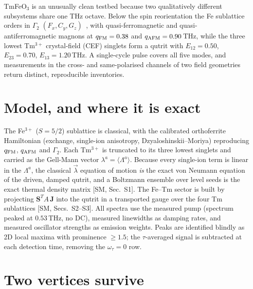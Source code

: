 \documentclass[aps,prb,twocolumn,superscriptaddress,longbibliography]{revtex4-2}
\newcommand{\ve}[1]{\boldsymbol{#1}}
\newcommand{\qafm}{q_{\rm AFM}}
\newcommand{\qfm}{q_{\rm FM}}
\begin{document}
TmFeO$_3$ is an unusually clean testbed because two qualitatively
different subsystems share one THz octave.  Below the spin reorientation
the Fe sublattice orders in $\Gamma_2$
$(F_x,C_y,G_z)$~\cite{Yamaguchi,Kimel2004,Zhang2016}, with
quasi-ferromagnetic and quasi-antiferromagnetic magnons at $\qfm=0.38$
and $\qafm=0.90$\,THz, while the three lowest Tm$^{3+}$ crystal-field
(CEF) singlets form a qutrit with $E_{12}=0.50$, $E_{23}=0.70$,
$E_{13}=1.20$\,THz.  A single-cycle pulse covers all five modes, and
measurements in the cross- and same-polarised channels of two field
geometries return distinct, reproducible inventories.

\section{Model, and where it is exact}

The Fe$^{3+}$ ($S=5/2$) sublattice is classical, with the calibrated
orthoferrite Hamiltonian (exchange, single-ion anisotropy,
Dzyaloshinskii--Moriya) reproducing $\qfm$, $\qafm$ and $\Gamma_2$.  Each
Tm$^{3+}$ is truncated to its three lowest singlets and carried as the
Gell-Mann vector $\lambda^a=\langle\Lambda^a\rangle$.  Because every
single-ion term is linear in the $\Lambda^a$, the classical
$\vec\lambda$ equation of motion \emph{is} the exact von Neumann
equation of the driven, damped qutrit, and a Boltzmann ensemble over
level seeds is the exact thermal density matrix [SM, Sec.~S1].  The
Fe--Tm sector is built by projecting $\ve S^{T}\!A\,\ve J$ into the
qutrit in a transported gauge over the four Tm sublattices [SM,
Secs.~S2--S3].  All spectra use the measured pump (spectrum peaked at
$0.53$\,THz, no DC), measured linewidths as damping rates, and measured
oscillator strengths as emission weights.  Peaks are identified blindly
as 2D local maxima with prominence $\geq1.5$; the $\tau$-averaged signal
is subtracted at each detection time, removing the $\omega_\tau=0$ row.

\section{Two vertices survive}
\end{document}
